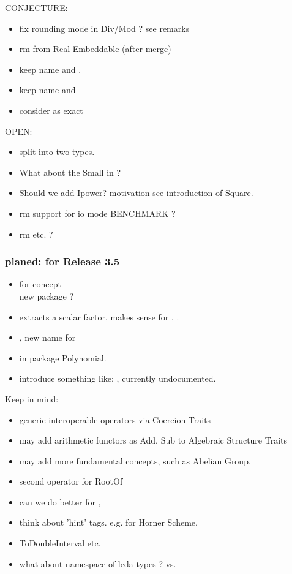 CONJECTURE:
\begin{itemize}
\item fix rounding mode in Div/Mod ? see remarks
\item rm  from Real Embeddable (after merge)
\item keep name  and .
\item keep name  and 
\item consider  as exact 
\end{itemize}


OPEN:
\begin{itemize}
\item split  into two types. 
\item What about the Small in ?
\item Should we add Ipower? motivation see introduction of Square.
\item rm support for io mode BENCHMARK ?
\item rm  etc. ? 
\end{itemize}

\subsubsection{planed: for Release 3.5}
\begin{itemize}
\item {} for concept \\
      new package ? 
\item {} extracts a scalar factor, 
      makes sense for , . 
\item {}, new name for 
\item {} in package Polynomial. 
\item introduce something like: , currently undocumented.     
\end{itemize}

Keep in mind: 
\begin{itemize}
\item generic interoperable operators via Coercion Traits
\item may add arithmetic functors as Add, Sub to Algebraic Structure Traits
\item may add more fundamental concepts, such as Abelian Group.
\item second operator for RootOf
\item can we do better for , 
\item think about 'hint' tags. e.g. for Horner Scheme. 
\item ToDoubleInterval etc. 
\item what about namespace of leda types ?  vs. 
\end{itemize}


